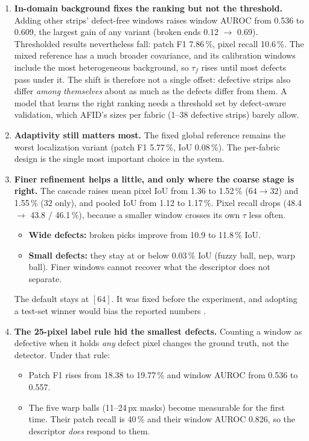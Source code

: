 \documentclass[11pt,a4paper]{article}
\begin{document}
\begin{enumerate}
  \item \textbf{In-domain background fixes the ranking but not the threshold.} Adding other strips' defect-free windows raises window AUROC from 0.536 to 0.609, the largest gain of any variant (broken ends 0.12 $\rightarrow$ 0.69). Thresholded results nevertheless fall: patch F1 7.86\,\%, pixel recall 10.6\,\%. The mixed reference has a much broader covariance, and its calibration windows include the most heterogeneous background, so $\tau_f$ rises until most defects pass under it. The shift is therefore not a single offset: defective strips also differ \emph{among themselves} about as much as the defects differ from them. A model that learns the right ranking needs a threshold set by defect-aware validation, which AFID's sizes per fabric (1--38 defective strips) barely allow.
  \item \textbf{Adaptivity still matters most.} The fixed global reference remains the worst localization variant (patch F1 5.77\,\%, IoU 0.08\,\%). The per-fabric design is the single most important choice in the system.
  \item \textbf{Finer refinement helps a little, and only where the coarse stage is right.} The cascade raises mean pixel IoU from 1.36 to 1.52\,\% ($64\rightarrow32$) and 1.55\,\% ($32$ only), and pooled IoU from 1.12 to 1.17\,\%. Pixel recall drops (48.4 $\rightarrow$ 43.8 / 46.1\,\%), because a smaller window crosses its own $\tau$ less often.
  \begin{itemize}
    \item \textbf{Wide defects:} broken picks improve from 10.9 to 11.8\,\% IoU.
    \item \textbf{Small defects:} they stay at or below 0.03\,\% IoU (fuzzy ball, nep, warp ball). Finer windows cannot recover what the descriptor does not separate.
  \end{itemize}
  The default stays at $[64]$. It was fixed before the experiment, and adopting a test-set winner would bias the reported numbers \cite{varma2006}.
  \item \textbf{The 25-pixel label rule hid the smallest defects.} Counting a window as defective when it holds \emph{any} defect pixel changes the ground truth, not the detector. Under that rule:
  \begin{itemize}
    \item Patch F1 rises from 18.38 to 19.77\,\% and window AUROC from 0.536 to 0.557.
    \item The five warp balls (11--24\,px masks) become measurable for the first time. Their patch recall is 40\,\% and their window AUROC 0.826, so the descriptor \emph{does} respond to them.

\end{itemize}
\end{enumerate}
\end{document}
